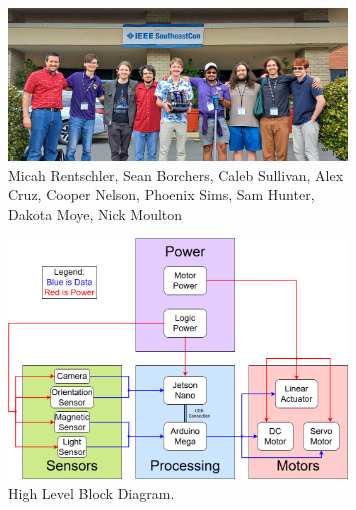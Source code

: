 \documentclass[final]{beamer}
\newlength{\sepwidth}
\newlength{\colwidth}
\newcommand{\separatorcolumn}{\begin{column}{\sepwidth}\end{column}}
\begin{document}
\begin{frame}[t]
\begin{columns}[t]
\begin{column}{\colwidth}
\end{column}

\separatorcolumn

\begin{column}{\colwidth}

    \begin{figure}
      \centering
      \includegraphics[width=30.0cm]{Team Picture SECON 2025.jpg}
      \caption{Micah Rentschler, Sean Borchers, Caleb Sullivan, Alex Cruz, Cooper Nelson, Phoenix Sims, Sam Hunter, Dakota Moye, Nick Moulton}
    \end{figure}

    \begin{figure}
      \centering
      \includegraphics[width=20.0cm]{High_Block_Diagram.png}
      \caption{High Level Block Diagram.}
    \end{figure}

\end{column}

\separatorcolumn

\begin{column}{\colwidth}


\end{column}
\end{columns}
\end{frame}
\end{document}
